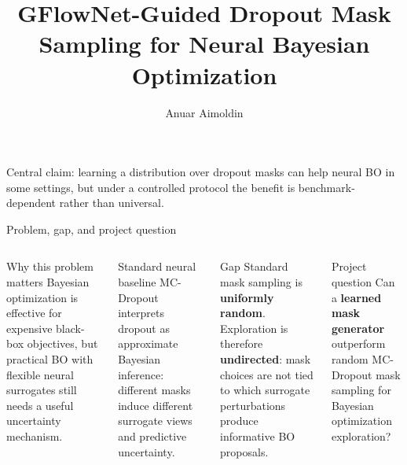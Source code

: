 \documentclass[aspectratio=169]{beamer}
\title[GFlowNet-BO]{GFlowNet-Guided Dropout Mask Sampling for Neural Bayesian Optimization}
\author{Anuar Aimoldin}
\institute{Course Project Presentation\\[-0.2em]\TinyCap Learned dropout-mask generation for neural Bayesian optimization under a controlled evaluation protocol}
\date{}
\newcommand{\TinyCap}{\fontsize{7.6}{8.6}\selectfont}
\begin{document}
\begin{frame}
  \titlepage
  \vspace{-0.7em}
  \begin{center}
    {\TinyCap Central claim: learning a distribution over dropout masks can help neural BO in some settings, but under a controlled protocol the benefit is benchmark-dependent rather than universal.}
  \end{center}
\end{frame}

\begin{frame}{Problem, gap, and project question}
\vspace{-0.55em}
\begin{columns}[T,onlytextwidth]
\begin{minipage}[t][0.80\textheight]{\linewidth}\vspace{0pt}
  \begin{cardA}{Why this problem matters}
  Bayesian optimization is effective for expensive black-box objectives, but practical BO with flexible neural surrogates still needs a useful uncertainty mechanism.
  \end{cardA}

  \vfill

  \begin{card}{Standard neural baseline}
  MC-Dropout interprets dropout as approximate Bayesian inference: different masks induce different surrogate views and predictive uncertainty.
  \end{card}

  \vfill

  \begin{cardW}{Gap}
  Standard mask sampling is \textbf{uniformly random}. Exploration is therefore \textbf{undirected}: mask choices are not tied to which surrogate perturbations produce informative BO proposals.
  \end{cardW}
\end{minipage}

\begin{minipage}[t][0.80\textheight]{\linewidth}\vspace{0pt}
  \begin{cardG}{Project question}
  Can a \textbf{learned mask generator} outperform random MC-Dropout mask sampling for Bayesian optimization exploration?
  \end{cardG}


\end{minipage}
\end{columns}
\end{frame}
\end{document}
